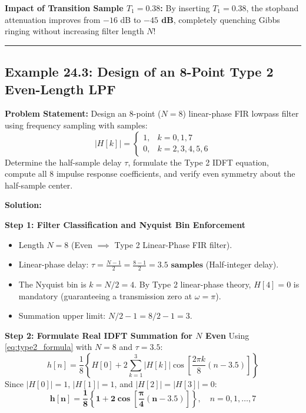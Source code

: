 \documentclass[11pt,a4paper]{article}
\begin{document}
\noindent\textbf{Impact of Transition Sample $T_1 = 0.38$:}
By inserting $T_1 = 0.38$, the stopband attenuation improves from $-16$ dB to \textbf{$-45$ dB}, completely quenching Gibbs ringing without increasing filter length $N$!

\vspace{3mm}
\noindent\rule{\textwidth}{0.5pt}

\subsection{Example 24.3: Design of an 8-Point Type 2 Even-Length LPF}
\textbf{Problem Statement:} Design an 8-point ($N=8$) linear-phase FIR lowpass filter using frequency sampling with samples:
\begin{equation}
|H[k]| = \begin{cases} 1, & k = 0, 1, 7 \\ 0, & k = 2, 3, 4, 5, 6 \end{cases}
\end{equation}
Determine the half-sample delay $\tau$, formulate the Type 2 IDFT equation, compute all 8 impulse response coefficients, and verify even symmetry about the half-sample center.

\vspace{2mm}
\noindent\textbf{Solution:}

\noindent\textbf{Step 1: Filter Classification and Nyquist Bin Enforcement}
\begin{itemize}
    \item Length $N = 8$ (Even $\implies$ Type 2 Linear-Phase FIR filter).
    \item Linear-phase delay: $\tau = \frac{N-1}{2} = \frac{8-1}{2} = \mathbf{3.5 \text{ samples}}$ (Half-integer delay).
    \item The Nyquist bin is $k = N/2 = 4$. By Type 2 linear-phase theory, $H[4] = 0$ is mandatory (guaranteeing a transmission zero at $\omega = \pi$).
    \item Summation upper limit: $N/2 - 1 = 8/2 - 1 = 3$.
\end{itemize}

\noindent\textbf{Step 2: Formulate Real IDFT Summation for $N$ Even}
Using \eqref{eq:type2_formula} with $N=8$ and $\tau = 3.5$:
\begin{equation}
h[n] = \frac{1}{8} \left\{ H[0] + 2 \sum_{k=1}^{3} |H[k]| \cos\left[ \frac{2\pi k}{8} (n - 3.5) \right] \right\}
\end{equation}
Since $|H[0]| = 1$, $|H[1]| = 1$, and $|H[2]| = |H[3]| = 0$:
\begin{equation}
\mathbf{h[n] = \frac{1}{8} \left\{ 1 + 2 \cos\left[ \frac{\pi}{4} (n - 3.5) \right] \right\}}, \quad n = 0, 1, \dots, 7
\end{equation}
\end{document}
